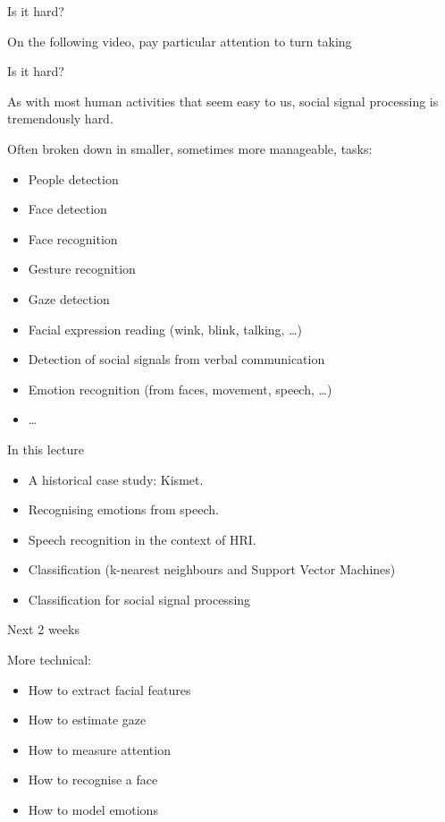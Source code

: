 \documentclass[compress]{beamer}
\begin{document}
\begin{frame}{Is it hard?}

    On the following video, pay particular attention to turn taking
\end{frame}


\begin{frame}{Is it hard?}

As with most human activities that seem easy to us, social signal
processing is tremendously hard.

Often broken down in smaller, sometimes more manageable, tasks:

\begin{itemize}

\item People detection
\item Face detection
\item Face recognition
\item Gesture recognition
\item Gaze detection
\item Facial expression reading (wink, blink, talking, \ldots{})
\item Detection of social signals from verbal communication
\item Emotion recognition (from faces, movement, speech, \ldots{})
\item \ldots{}
\end{itemize}

\end{frame}

\begin{frame}{In this lecture}

\begin{itemize}

\item A historical case study: Kismet.
\item Recognising emotions from speech.
\item Speech recognition in the context of HRI.
\item Classification (k-nearest neighbours and Support Vector Machines)
\item Classification for social signal processing
\end{itemize}

\end{frame}


\begin{frame}{Next 2 weeks}

    More technical:

    \begin{itemize}
        \item How to extract facial features
        \item How to estimate gaze
        \item How to measure attention
        \item How to recognise a face
        \item How to model emotions
    \end{itemize}

\end{frame}
\end{document}
